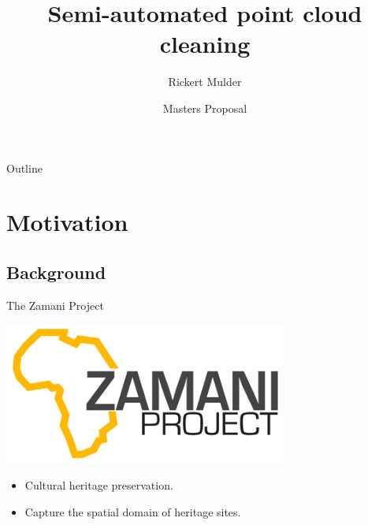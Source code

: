 \documentclass{beamer}
\title{Semi-automated point cloud cleaning}
\author{Rickert Mulder}
\institute[U of X]
{
  Department of Computer Science\\
  University of Cape Town
}
\date[CFP 2003] %
{Masters Proposal}
\begin{document}
\begin{frame}
  \titlepage
\end{frame}

\begin{frame}{Outline}
  \tableofcontents
\end{frame}





\section{Motivation}

\subsection{Background}

\begin{frame}{The Zamani Project}

  \includegraphics[width=0.70\textwidth]{pics/Zamani_logo}

  \begin{itemize}
  \item
    Cultural heritage preservation.
  \item
    Capture the spatial domain of heritage sites.
  \end{itemize}
\end{frame}
\end{document}
